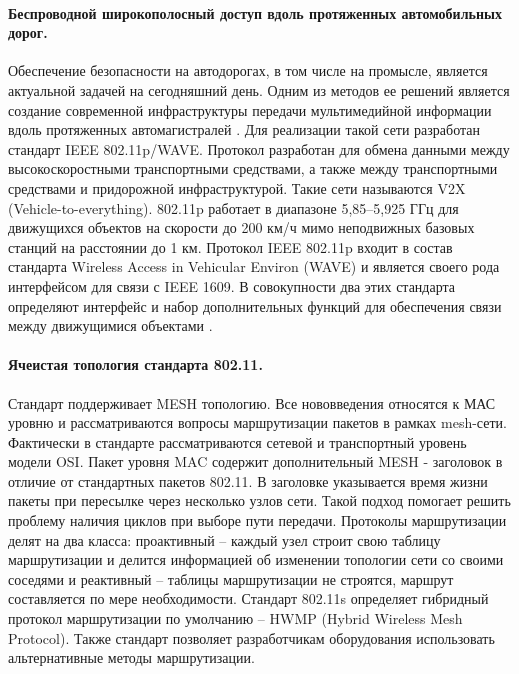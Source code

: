 \paragraph{Беспроводной широкополосный доступ вдоль протяженных автомобильных дорог.}
Обеспечение безопасности на автодорогах, в том числе на промысле, является  актуальной задачей на сегодняшний день. Одним из методов ее решений является создание современной инфраструктуры передачи мультимедийной информации вдоль протяженных автомагистралей \cite{Vish2015}. Для реализации такой сети разработан стандарт IEEE 802.11p/WAVE. Протокол разработан для обмена данными между высокоскоростными транспортными средствами, а также между транспортными средствами и придорожной инфраструктурой. Такие сети называются V2X (Vehicle-to-everything). 802.11p работает в диапазоне 5,85–5,925 ГГц для движущихся объектов на скорости до 200 км/ч мимо неподвижных базовых станций на расстоянии до 1 км. Протокол IEEE 802.11p входит в состав стандарта Wireless Access in Vehicular Environ (WAVE) и является своего рода интерфейсом для связи с IEEE 1609. В совокупности два этих стандарта определяют интерфейс и набор дополнительных функций для обеспечения связи между движущимися объектами \cite{IEEE802.11p}.

\paragraph{Ячеистая топология стандарта 802.11.} Стандарт поддерживает MESH топологию. Все нововведения относятся к МАС уровню и рассматриваются вопросы маршрутизации пакетов в рамках mesh-сети. Фактически в стандарте рассматриваются сетевой и транспортный уровень модели OSI. Пакет уровня MAC содержит дополнительный MESH - заголовок в отличие от стандартных пакетов 802.11. В заголовке указывается время жизни пакеты при пересылке через несколько узлов сети. Такой подход помогает решить проблему наличия циклов при выборе пути передачи. Протоколы маршрутизации делят на два класса: проактивный -- каждый узел строит свою таблицу маршрутизации и делится информацией об изменении топологии сети со своими соседями и реактивный --  таблицы маршрутизации не строятся, маршрут составляется по мере необходимости. Стандарт 802.11s определяет гибридный протокол маршрутизации по умолчанию -- HWMP (Hybrid Wireless Mesh Protocol). Также стандарт позволяет разработчикам оборудования использовать альтернативные методы маршрутизации.





